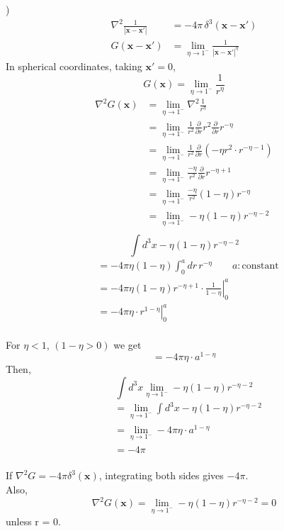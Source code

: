 \documentclass[letterpage]{article}
\begin{document}
\newpage
{})
\begin{align*}
  \nabla^2 \frac{1}{|\mathbf{x} - \mathbf{x'}|} &= -4\pi \,\delta^3 (\mathbf{x} - 
  \mathbf{x'})\\
  G(\mathbf{x}-\mathbf{x'}) &= \lim_{\eta \to 1^-} \frac{1}{|\mathbf{x}-
  \mathbf{x'}|^\eta}
\end{align*}
In spherical coordinates, taking $\mathbf{x'} = 0$,
\begin{equation*}
  G(\mathbf{x}) = \lim_{\eta \to 1^-} \frac{1}{r^\eta}
\end{equation*}
\begin{align*}
  \nabla^2 G(\mathbf{x}) &= \lim_{\eta \to 1^-} \nabla^2 \frac{1}{r^\eta}\\
  &= \lim_{\eta \to 1^-} \frac{1}{r^2}\frac{\partial}{\partial r} r^2
  \frac{\partial}{\partial r}r^{-\eta}\\
  &= \lim_{\eta \to 1^-} \frac{1}{r^2} \frac{\partial}{\partial r} (-\eta r^2
  \cdot r^{-\eta -1})\\
  &= \lim_{\eta \to 1^-} \frac{-\eta}{r^2} \frac{\partial}{\partial r} 
  r^{-\eta + 1}\\
  &= \lim_{\eta \to 1^-} \frac{-\eta}{r^2}(1-\eta) r^{-\eta}\\
  &= \lim_{\eta \to 1^-} -\eta(1-\eta)r^{-\eta - 2}\\  
\end{align*}
\begin{equation*}
  \int d^3x -\eta(1 - \eta) r^{-\eta - 2}
\end{equation*}
\begin{align*}
  &= -4\pi \eta(1 - \eta) \int_0^a dr \,r^{-\eta} \qquad a : \text{constant}\\
  &= -4\pi \eta(1 - \eta) r^{-\eta + 1} \cdot \left. \frac{1}{1 - \eta} 
  \right|_0^a\\
  &= -4\pi \eta \cdot \left. r^{1 - \eta} \right| _0^a
\end{align*}\\
\noindent
For $\eta < 1$, $(1 - \eta > 0)$ we get
\begin{equation*}
  = -4\pi \eta \cdot a^{1 - \eta}
\end{equation*}
\noindent
Then,
\begin{equation*}
  \int d^3x \lim_{\eta \to 1^-} - \eta(1-\eta) r^{-\eta-2}
\end{equation*}
\begin{align*}
  &= \lim_{\eta \to 1^-} \int d^3x - \eta(1-\eta)r^{-\eta-2}\\
  &= \lim_{\eta \to 1^-} -4\pi \eta \cdot a^{1-\eta}\\
  &= -4\pi
\end{align*}\\
\noindent
If $\nabla^2G = -4\pi \delta^3 (\textbf{x})$, integrating both sides gives 
$-4\pi$.\\ 
Also,
\begin{equation*}
  \nabla^2G (\textbf{x}) = \lim_{\eta \to 1^-} - \eta(1-\eta) r^{-\eta-2} = 0
\end{equation*} 
unless r = 0.\\
\end{document}
